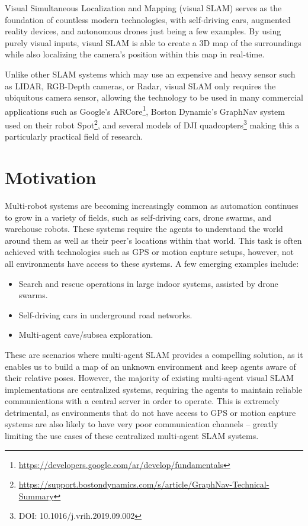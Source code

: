 
\label{sec:introduction}
Visual Simultaneous Localization and Mapping (visual SLAM) serves as the foundation of countless modern technologies, with self-driving cars, augmented reality devices, and autonomous drones just being a few examples. By using purely visual inputs, visual SLAM is able to create a 3D map of the surroundings while also localizing the camera's position within this map in real-time.

Unlike other SLAM systems which may use an expensive and heavy sensor such as LIDAR, RGB-Depth cameras, or Radar, visual SLAM only requires the ubiquitous camera sensor, allowing the technology to be used in many commercial applications such as Google's ARCore\footnote[1]{\url{https://developers.google.com/ar/develop/fundamentals}}, Boston Dynamic's GraphNav system used on their robot Spot\footnote[2]{\url{https://support.bostondynamics.com/s/article/GraphNav-Technical-Summary}}, and several models of DJI quadcopters\footnote[3]{DOI: 10.1016/j.vrih.2019.09.002} making this a particularly practical field of research.

\section{Motivation}
\label{sec:motivation}
Multi-robot systems are becoming increasingly common as automation continues to grow in a variety of fields, such as self-driving cars, drone swarms, and warehouse robots. These systems require the agents to understand the world around them as well as their peer's locations within that world. This task is often achieved with technologies such as GPS or motion capture setups, however, not all environments have access to these systems. A few emerging examples include: \noparskip
\smallbreak

{
    \begin{itemize}[nosep]
        \item Search and rescue operations in large indoor systems, assisted by drone swarms.
        \item Self-driving cars in underground road networks.
        \item Multi-agent cave/subsea exploration.
    \end{itemize}
}

These are scenarios where multi-agent SLAM provides a compelling solution, as it enables us to build a map of an unknown environment and keep agents aware of their relative poses. However, the majority of existing multi-agent visual SLAM implementations are centralized systems, requiring the agents to maintain reliable communications with a central server in order to operate. This is extremely detrimental, as environments that do not have access to GPS or motion capture systems are also likely to have very poor communication channels – greatly limiting the use cases of these centralized multi-agent SLAM systems.

